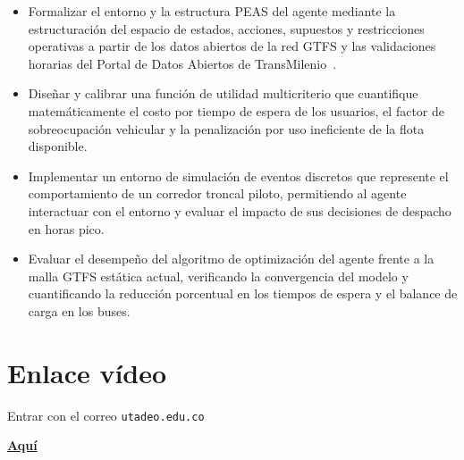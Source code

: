 \documentclass{article}
\begin{document}
\begin{itemize}
    \item Formalizar el entorno y la estructura PEAS del agente mediante la estructuración del espacio de estados, acciones, supuestos y restricciones operativas a partir de los datos abiertos de la red GTFS y las validaciones horarias del Portal de Datos Abiertos de TransMilenio~\cite{transmilenio2026datosabiertos}. 
    \item Diseñar y calibrar una función de utilidad multicriterio que cuantifique matemáticamente el costo por tiempo de espera de los usuarios, el factor de sobreocupación vehicular y la penalización por uso ineficiente de la flota disponible.  
    \item Implementar un entorno de simulación de eventos discretos que represente el comportamiento de un corredor troncal piloto, permitiendo al agente interactuar con el entorno y evaluar el impacto de sus decisiones de despacho en horas pico. 
    \item Evaluar el desempeño del algoritmo de optimización del agente frente a la malla GTFS estática actual, verificando la convergencia del modelo y cuantificando la reducción porcentual en los tiempos de espera y el balance de carga en los buses. 
\end{itemize}


\section{Enlace vídeo}

Entrar con el correo \texttt{utadeo.edu.co}

\href{https://utadeoeduco0-my.sharepoint.com/:v:/g/personal/ludwig_alvaradob_utadeo_edu_co/IQCiziMBhBLFRr7USRWr229VAeKW1t1dJSIDF9qKpHm_7K4?nav=eyJyZWZlcnJhbEluZm8iOnsicmVmZXJyYWxBcHAiOiJPbmVEcml2ZUZvckJ1c2luZXNzIiwicmVmZXJyYWxBcHBQbGF0Zm9ybSI6IldlYiIsInJlZmVycmFsTW9kZSI6InZpZXciLCJyZWZlcnJhbFZpZXciOiJNeUZpbGVzTGlua0NvcHkifX0&e=Zf0X3v}{\textbf{Aquí}}


\printbibliography

\newpage

\thispagestyle{empty}

\vspace*{0.3\textwidth}

\begin{figure}[H]
  \centering
  
\end{figure}
\end{document}
